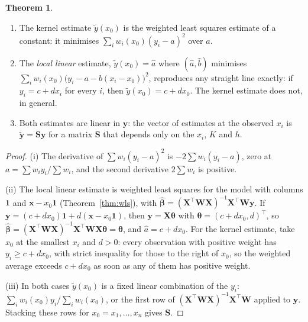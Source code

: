 \documentclass[11pt,a4paper]{article}
\numberwithin{equation}{section}
\theoremstyle{definition}
\newtheorem{thm}{Theorem}[subsection]
\begin{document}
\begin{thm}\label{thm:local-fit}
\begin{enumerate}[label=(\roman*)]
\item The kernel estimate $\tilde y(x_0)$ is the weighted least squares estimate of a constant: it minimises
$\sum_i w_i(x_0)(y_i - a)^2$ over $a$.
\item The \emph{local linear} estimate, $\tilde y(x_0) = \hat a$ where $(\hat a, \hat b)$ minimises
$\sum_i w_i(x_0)\bigl(y_i - a - b(x_i - x_0)\bigr)^2$, reproduces any straight line exactly: if $y_i = c + dx_i$ for every $i$,
then $\tilde y(x_0) = c + dx_0$. The kernel estimate does not, in general.
\item Both estimates are linear in $\mathbf{y}$: the vector of estimates at the observed $x_i$ is $\tilde{\mathbf{y}} = \mathbf{Sy}$ for a
matrix $\mathbf{S}$ that depends only on the $x_i$, $K$ and $h$.
\end{enumerate}
\end{thm}

\begin{proof}
(i) The derivative of $\sum w_i(y_i - a)^2$ is $-2\sum w_i(y_i - a)$, zero at $a = \sum w_iy_i/\sum w_i$, and the second derivative
$2\sum w_i$ is positive.

(ii) The local linear estimate is weighted least squares for the model with columns $\mathbf{1}$ and $\mathbf{x} - x_0\mathbf{1}$
(Theorem~\ref{thm:wls}), with $\hat{\boldsymbol\beta} = (\mathbf{X}^\top\mathbf{WX})^{-1}\mathbf{X}^\top\mathbf{Wy}$. If $\mathbf{y} = (c + dx_0)\mathbf{1} + d(\mathbf{x} - x_0\mathbf{1})$,
then $\mathbf{y} = \mathbf{X}\boldsymbol\theta$ with $\boldsymbol\theta = (c + dx_0, d)^\top$, so $\hat{\boldsymbol\beta} = (\mathbf{X}^\top\mathbf{WX})^{-1}\mathbf{X}^\top\mathbf{WX}\boldsymbol\theta = \boldsymbol\theta$, and $\hat a = c + dx_0$.
For the kernel estimate, take $x_0$ at the smallest $x_i$ and $d > 0$: every observation with positive weight has
$y_i \ge c + dx_0$, with strict inequality for those to the right of $x_0$, so the weighted average exceeds $c + dx_0$ as soon
as any of them has positive weight.

(iii) In both cases $\tilde y(x_0)$ is a fixed linear combination of the $y_i$: $\sum_i w_i(x_0)y_i/\sum_i w_i(x_0)$, or the first
row of $(\mathbf{X}^\top\mathbf{WX})^{-1}\mathbf{X}^\top\mathbf{W}$ applied to $\mathbf{y}$. Stacking these rows for $x_0 = x_1, \dots, x_n$ gives $\mathbf{S}$.
\end{proof}
\end{document}
